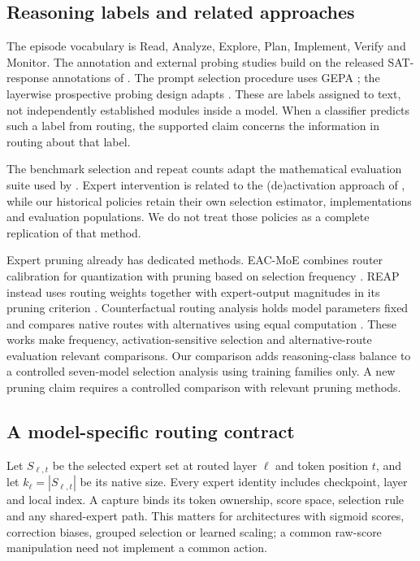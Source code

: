 \subsection{Reasoning labels and related approaches}
The episode vocabulary is Read, Analyze, Explore, Plan, Implement, Verify
and Monitor. The annotation and external probing studies build on the
released SAT-response annotations of \citet{li2025schoenfeld}. The prompt
selection procedure uses GEPA \citep{agrawal2026gepa}; the layerwise
prospective probing design adapts \citet{sun2026trajectories}. These are
labels assigned to text, not independently established modules inside a
model. When a classifier predicts such a label from routing, the supported
claim concerns the information in routing about that label.

The benchmark selection and repeat counts adapt the
mathematical evaluation suite used by \citet{liu2025spiral}.
Expert intervention is related to the (de)activation approach of
\citet{fayyaz2025steermoe}, while our historical policies retain their own
selection estimator, implementations and evaluation populations. We do
not treat those policies as a complete replication of that method.

Expert pruning already has dedicated methods. EAC-MoE combines router
calibration for quantization with pruning based on selection frequency
\citep{chen2025eac}. REAP instead uses routing weights together with
expert-output magnitudes in its pruning criterion \citep{lasby2026reap}.
Counterfactual routing analysis holds model parameters fixed and compares
native routes with alternatives using equal computation
\citep{yoon2026misrouted}. These works make frequency, activation-sensitive
selection and alternative-route evaluation relevant comparisons. Our
comparison adds reasoning-class balance to a controlled seven-model
selection analysis using training families only. A new pruning
claim requires a controlled comparison with relevant pruning methods.

\subsection{A model-specific routing contract}
Let $S_{\ell,t}$ be the selected expert set at routed layer $\ell$ and token
position $t$, and let $k_\ell=|S_{\ell,t}|$ be its native size. Every expert
identity includes checkpoint, layer and local index. A capture binds its
token ownership, score space, selection rule and any shared-expert path.
This matters for architectures with sigmoid scores, correction biases,
grouped selection or learned scaling; a common raw-score manipulation need
not implement a common action.

